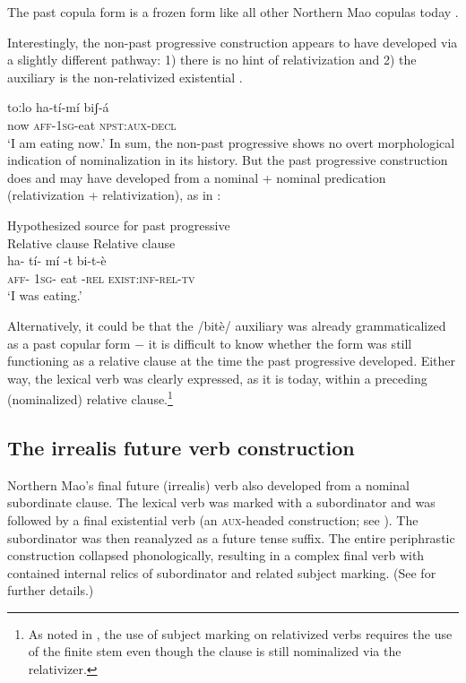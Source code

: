 \documentclass[output=paper]{langsci/langscibook}
\begin{document}
The past copula form is a frozen form like all other Northern Mao copulas today \citep[465]{Ahland2012}.

Interestingly, the non-past progressive construction appears to have developed via a slightly different pathway: 1) there is no hint of relativization and 2) the auxiliary is the non-relativized existential . 

\ea\label{ex:mahland:71}
\gll toːlo   ha-tí-mí         biʃ-á   \\
now   \textsc{aff-1sg}{}-eat    \textsc{npst:aux-decl} \\
\glt `I am eating now.'
\z
In sum, the non-past progressive shows no overt morphological indication of nominalization in its history. But the past progressive construction does and may have developed from a nominal + nominal predication (relativization + relativization), as in : 

\ea\label{ex:mahland:72}
Hypothesized source for past progressive\\
Relative clause      Relative clause \\
\gll ha-  tí-  mí  {}-t         bi-t-è\\
\textsc{aff-  1sg-}  eat    {}-\textsc{rel}     \textsc{exist:inf-rel-tv}\\
\glt `I was eating.'
\z

Alternatively, it could be that the /bitè/ auxiliary was already grammaticalized as a past copular form $-$ it is difficult to know whether the form was still functioning as a relative clause at the time the past progressive developed. Either way, the lexical verb was clearly expressed, as it is today, within a preceding (nominalized) relative clause.\footnote{As noted in , the use of subject marking on relativized verbs requires the use of the finite stem even though the clause is still nominalized via the relativizer.}

\subsection{The irrealis future verb construction}\label{sec:mahland:3.3}

Northern Mao's final future (irrealis) verb also developed from a nominal subordinate clause. The lexical verb was marked with a subordinator and was followed by a final existential verb (an \textsc{aux}{}-headed construction; see \citealt[39ff]{Anderson2006}). The subordinator was then reanalyzed as a future tense suffix. The entire periphrastic construction collapsed phonologically, resulting in a complex final verb with contained internal relics of subordinator and related subject marking. (See \citealt{Ahland2014b} for further details.) 
\end{document}
